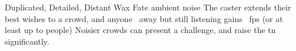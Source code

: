   {Duplicated, Detailed, Distant}%
  {Wax}%
  {Fate}%
  {ambient noise}%
  {The caster extends their best wishes to a crowd, and anyone \spellRange\ away but still listening gains \showDam~\glspl{fp} (or at least up to  people)}%
  {Noisier crowds can present a challenge, and raise the \gls{tn} significantly.}
